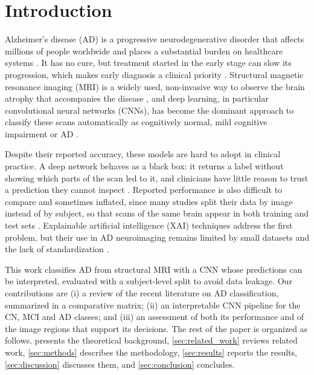 \section{Introduction}
\label{sec:introduction}

Alzheimer's disease (AD) is a progressive neurodegenerative disorder that affects millions of people worldwide and places a substantial burden on healthcare systems \parencite{taiyebkhosroshahi2025explainable}. It has no cure, but treatment started in the early stage can slow its progression, which makes early diagnosis a clinical priority \parencite{nibila2026artificial}. Structural magnetic resonance imaging (MRI) is a widely used, non-invasive way to observe the brain atrophy that accompanies the disease \parencite{frisoni2010clinical}, and deep learning, in particular convolutional neural networks (CNNs), has become the dominant approach to classify these scans automatically as cognitively normal, mild cognitive impairment or AD \parencite{nibila2026artificial}.

Despite their reported accuracy, these models are hard to adopt in clinical practice. A deep network behaves as a black box: it returns a label without showing which parts of the scan led to it, and clinicians have little reason to trust a prediction they cannot inspect \parencite{taiyebkhosroshahi2025explainable}. Reported performance is also difficult to compare and sometimes inflated, since many studies split their data by image instead of by subject, so that scans of the same brain appear in both training and test sets \parencite{wen2020convolutional}. Explainable artificial intelligence (XAI) techniques address the first problem, but their use in AD neuroimaging remains limited by small datasets and the lack of standardization \parencite{taiyebkhosroshahi2025explainable}.

This work classifies AD from structural MRI with a CNN whose predictions can be interpreted, evaluated with a subject-level split to avoid data leakage. Our contributions are (i) a review of the recent literature on AD classification, summarized in a comparative matrix; (ii) an interpretable CNN pipeline for the CN, MCI and AD classes; and (iii) an assessment of both its performance and of the image regions that support its decisions. The rest of the paper is organized as follows.  presents the theoretical background, \cref{sec:related_work} reviews related work, \cref{sec:methods} describes the methodology, \cref{sec:results} reports the results, \cref{sec:discussion} discusses them, and \cref{sec:conclusion} concludes.
